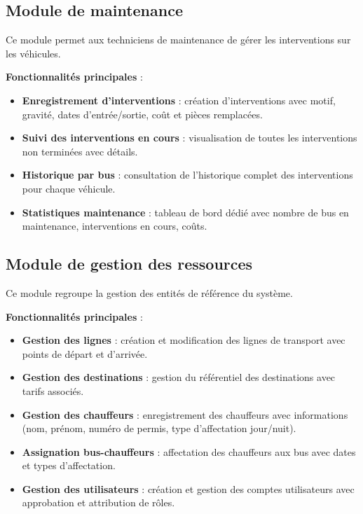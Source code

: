 \documentclass[a4paper, 12pt]{book}
\begin{document}
\subsection{Module de maintenance}

Ce module permet aux techniciens de maintenance de gérer les interventions sur les véhicules.

\textbf{Fonctionnalités principales} :
\begin{itemize}
    \item \textbf{Enregistrement d'interventions} : création d'interventions avec motif, gravité, dates d'entrée/sortie, coût et pièces remplacées.
    \item \textbf{Suivi des interventions en cours} : visualisation de toutes les interventions non terminées avec détails.
    \item \textbf{Historique par bus} : consultation de l'historique complet des interventions pour chaque véhicule.
    \item \textbf{Statistiques maintenance} : tableau de bord dédié avec nombre de bus en maintenance, interventions en cours, coûts.
\end{itemize}

\subsection{Module de gestion des ressources}

Ce module regroupe la gestion des entités de référence du système.

\textbf{Fonctionnalités principales} :
\begin{itemize}
    \item \textbf{Gestion des lignes} : création et modification des lignes de transport avec points de départ et d'arrivée.
    \item \textbf{Gestion des destinations} : gestion du référentiel des destinations avec tarifs associés.
    \item \textbf{Gestion des chauffeurs} : enregistrement des chauffeurs avec informations (nom, prénom, numéro de permis, type d'affectation jour/nuit).
    \item \textbf{Assignation bus-chauffeurs} : affectation des chauffeurs aux bus avec dates et types d'affectation.
    \item \textbf{Gestion des utilisateurs} : création et gestion des comptes utilisateurs avec approbation et attribution de rôles.
\end{itemize}
\end{document}
